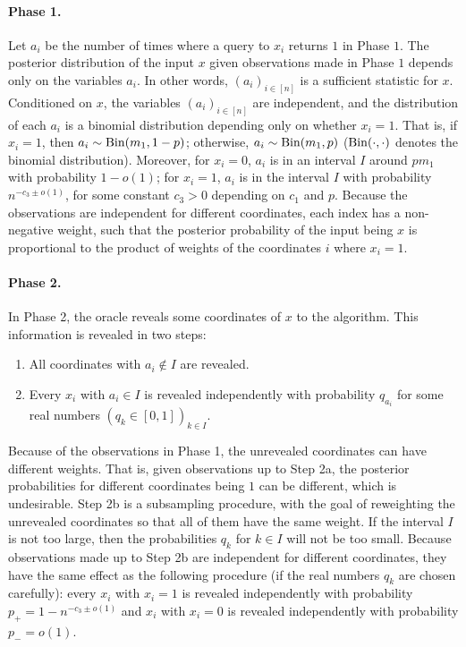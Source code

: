 \paragraph{Phase 1.} Let $a_i$ be the number of times where a query to $x_i$ returns $1$ in Phase $1$. The posterior distribution of the input $x$ given observations made in Phase $1$ depends only on the variables $a_i$. In other words, $(a_i)_{i \in [n]}$ is a sufficient statistic for $x$. Conditioned on $x$, the variables $(a_i)_{i \in [n]}$ are independent, and the distribution of each $a_i$ is a binomial distribution depending only on whether $x_i = 1$. That is, if $x_i = 1$, then $a_i \sim \operatorname{\mathrm{Bin}}(m_1, 1 - p)$; otherwise, $a_i \sim \operatorname{\mathrm{Bin}}(m_1, p)$ ($\operatorname{\mathrm{Bin}}(\cdot, \cdot)$ denotes the binomial distribution). Moreover, for $x_i = 0$, $a_i$ is in an interval $I$ around $p m_1$ with probability $1-o(1)$; for $x_i = 1$, $a_i$ is in the interval $I$ with probability $n^{-c_3\pm o(1)}$, for some constant $c_3>0$ depending on $c_1$ and $p$.
Because the observations are independent for different coordinates, each index has a non-negative weight, such that the posterior probability of the input being $x$ is proportional to the product of weights of the coordinates $i$ where $x_i = 1$.

\paragraph{Phase 2.} In Phase 2, the oracle reveals some coordinates of $x$ to the algorithm. This information is revealed in two steps:
\begin{enumerate}[label=2\alph*.]
\item All coordinates with $a_i \not \in I$ are revealed.
\item Every $x_i$ with $a_i \in I$ is revealed independently with probability $q_{a_i}$ for some real numbers $(q_k \in [0, 1])_{k \in I}$.
\end{enumerate}
Because of the observations in Phase 1, the unrevealed coordinates can have different weights.
That is, given observations up to Step 2a, the posterior probabilities for different coordinates being $1$ can be different, which is undesirable.
Step 2b is a subsampling procedure, with the goal of reweighting the unrevealed coordinates so that all of them have the same weight.
If the interval $I$ is not too large, then the probabilities $q_k$ for $k\in I$ will not be too small.
Because observations made up to Step 2b are independent for different coordinates, they have the same effect as the following procedure (if the real numbers $q_k$ are chosen carefully): every $x_i$ with $x_i = 1$ is revealed independently with probability $p_+=1-n^{-c_3\pm o(1)}$ and $x_i$ with $x_i = 0$ is revealed independently with probability $p_-=o(1)$.

